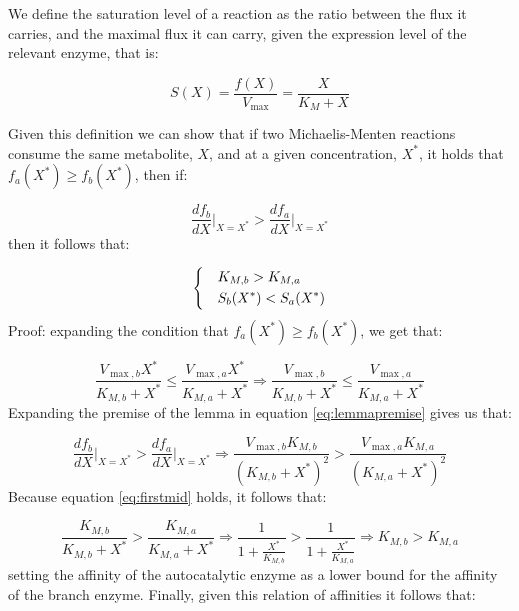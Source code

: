     We define the saturation level of a reaction as the ratio between the flux it carries, and the maximal flux it can carry, given the expression level of the relevant enzyme, that is:

    \begin{equation*}
      S(X)=\frac{f(X)}{V_{\max}}=\frac{X}{K_M+X}
    \end{equation*}

    Given this definition we can show that if two Michaelis-Menten reactions consume the same metabolite, $X$, and at a given concentration, $X^*$, it holds that $f_a(X^*)\geq f_b(X^*)$, then if:

    \begin{equation}
        \frac{df_b}{dX}\Big\vert_{X=X^*}>\frac{df_a}{dX}\Big\vert_{X=X^*}
        \label{eq:lemmapremise}
    \end{equation}
    then it follows that:

    \begin{equation}
        \label{eq:complexaffcond}
    \begin{dcases}
      & K_{M,b}>K_{M,a} \\
      & S_b(X^*)<S_a(X^*)
    \end{dcases}
    \end{equation}
    Proof: expanding the condition that $f_a(X^*)\geq f_b(X^*)$, we get that:

    \begin{equation}
        \frac{V_{\max,b}X^*}{K_{M,b}+X^*}\leq\frac{V_{\max,a}X^*}{K_{M,a}+X^*} \Rightarrow
         \frac{V_{\max,b}}{K_{M,b}+X^*}\leq\frac{V_{\max,a}}{K_{M,a}+X^*}
         \label{eq:firstmid}
     \end{equation}
     Expanding the premise of the lemma in equation \ref{eq:lemmapremise} gives us that:

     \begin{equation*}
        \frac{df_b}{dX}\Big\vert_{X=X^*}>\frac{df_a}{dX}\Big\vert_{X=X^*} \Rightarrow
        \frac{V_{\max,b}K_{M,b}}{(K_{M,b}+X^*)^2} > \frac{V_{\max,a}K_{M,a}}{(K_{M,a}+X^*)^2}
     \end{equation*}
     Because equation \ref{eq:firstmid} holds, it follows that:

     \begin{equation*}
         \frac{K_{M,b}}{K_{M,b}+X^*} > \frac{K_{M,a}}{K_{M,a}+X^*} \Rightarrow \frac{1}{1+\frac{X^*}{K_{M,b}}} > \frac{1}{1+\frac{X^*}{K_{M,a}}} \Rightarrow K_{M,b}>K_{M,a}
     \end{equation*}
    setting the affinity of the autocatalytic enzyme as a lower bound for the affinity of the branch enzyme.
    Finally, given this relation of affinities it follows that:

